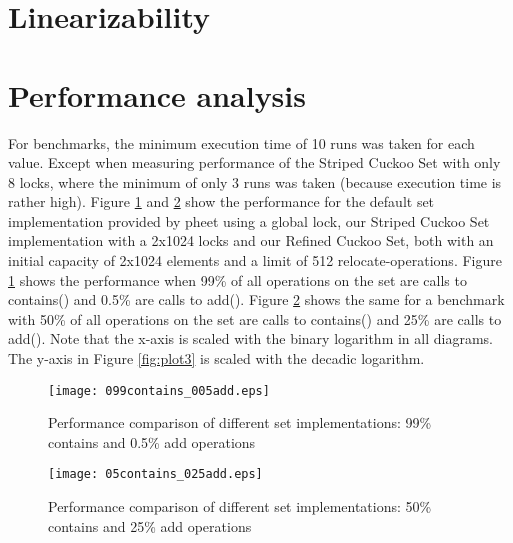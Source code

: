 \documentclass[a4paper,10pt]{article}
\begin{document}
\section{Linearizability}
\label{serc:linearizability}

\section{Performance analysis}
\label{sec:performance}
For benchmarks, the minimum execution time of 10 runs was taken for each value. Except when measuring performance of the Striped Cuckoo Set with only 8 locks, where the minimum of only 3 runs was taken (because execution time is rather high).
\medskip
\newline
Figure \ref{fig:plot1} and \ref{fig:plot2} show the performance for the default set implementation provided by pheet using a global lock, our Striped Cuckoo Set implementation with a 2x1024 locks and our Refined Cuckoo Set, both with an initial capacity of 2x1024 elements and a limit of 512 relocate-operations. Figure \ref{fig:plot1} shows the performance when 99\% of all operations on the set are calls to contains() and 0.5\% are calls to add(). Figure \ref{fig:plot2} shows the same for a benchmark with 50\% of all operations on the set are calls to contains() and 25\% are calls to add().
\newline
Note that the x-axis is scaled with the binary logarithm in all diagrams. The y-axis in Figure \ref{fig:plot3} is scaled with the decadic logarithm.

\begin{comment}
todo:
- which variant performs better when?
- asymptotic behaviour
- where is the cross-over point?
- anything unexpected?

\end{comment}


\begin{figure}[H]
\begin{center}
\texttt{[image: 099contains\_005add.eps]}
\end{center}
\caption{Performance comparison of different set implementations: 99\% contains and 0.5\% add operations}
\label{fig:plot1}
\end{figure}

\begin{figure}[H]
\begin{center}
\texttt{[image: 05contains\_025add.eps]}
\end{center}
\caption{Performance comparison of different set implementations: 50\% contains and 25\% add operations}
\label{fig:plot2}
\end{figure}
\end{document}
